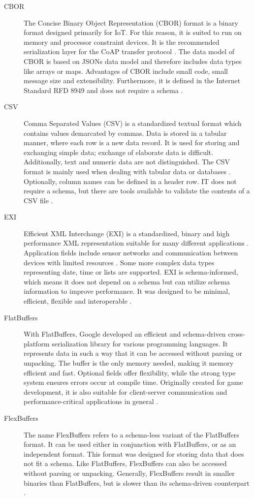 \documentclass[10pt]{IEEEtran}
\begin{document}
\begin{description}
    \item[CBOR]  The Concise Binary Object Representation (CBOR) format is a binary format designed primarily for IoT. For this reason, it is suited to run on memory and processor constraint devices. It is the recommended serialization layer for the CoAP transfer protocol \cite{viotti_2022}. The data model of CBOR is based on JSONs data model and therefore includes data types like arrays or maps. Advantages of CBOR include small code, small message size and extensibility. Furthermore, it is defined in the Internet Standard RFD 8949 and does not require a schema \cite{bormann_2020}.
    \item[CSV]  Comma Separated Values (CSV) is a standardized textual format which contains values demarcated by commas. Data is stored in a tabular manner, where each row is a new data record. It is used for storing and exchanging simple data; exchange of elaborate data is difficult. Additionally, text and numeric data are not distinguished. The CSV format is mainly used when dealing with tabular data or databases \cite{kaur_2020}. Optionally, column names can be defined in a header row. IT does not require a schema, but there are tools available to validate the contents of a CSV file \cite{sustainability_of_digital_formats_2024}.
    \item[EXI]  Efficient XML Interchange (EXI) is a standardized, binary and high performance XML representation suitable for many different applications \cite{w3c_2014}. Application fields include sensor networks and communication between devices with limited resources \cite{waher_2013}. Some more complex data types representing date, time or lists are supported. EXI is schema-informed, which means it does not depend on a schema but can utilize schema information to improve performance. It was designed to be minimal, efficient, flexible and interoperable \cite{w3c_2014}.  
    \item[FlatBuffers]  With FlatBuffers, Google developed an efficient and schema-driven cross-platform serialization library for various programming languages. It represents data in such a way that it can be accessed without parsing or unpacking. The buffer is the only memory needed, making it memory efficient and fast. Optional fields offer flexibility, while the strong type system ensures errors occur at compile time. Originally created for game development, it is also suitable for client-server communication and performance-critical applications in general \cite{google_2024}.
    \item[FlexBuffers]  The name FlexBuffers refers to a schema-less variant of the FlatBuffers format. It can be used either in conjunction with FlatBuffers, or as an independent format. This format was designed for storing data that does not fit a schema. Like FlatBuffers, FlexBuffers can also be accessed without parsing or unpacking. Generally, FlexBuffers result in smaller binaries than FlatBuffers, but is slower than its schema-driven counterpart \cite{google_2024}.

\end{description}
\end{document}
